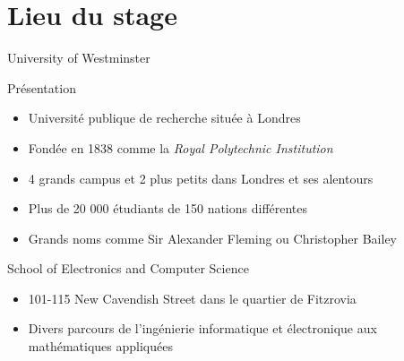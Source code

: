 \section{Lieu du stage}

\begin{frame}{University of Westminster}
	\begin{block}{Pr\'esentation}
		\begin{itemize}
			\item Universit\'e publique de recherche situ\'ee \`a Londres
			\item Fond\'ee en 1838 comme la \textit{Royal Polytechnic Institution}
			\item 4 grands campus et 2 plus petits dans Londres et ses alentours
			\item Plus de 20 000 \'etudiants de 150 nations diff\'erentes
			\item Grands noms comme Sir Alexander Fleming ou Christopher Bailey

		\end{itemize}

	\end{block}

	\begin{block}{School of Electronics and Computer Science}
		\begin{itemize}
			\item 101-115 New Cavendish Street dans le quartier de Fitzrovia
			\item Divers parcours de l'ing\'enierie informatique et \'electronique aux math\'ematiques appliqu\'ees

		\end{itemize}

	\end{block}

\end{frame}



